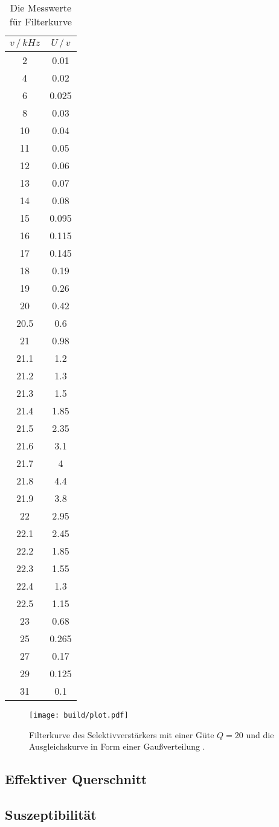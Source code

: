 \begin{table}[H]
    \centering
    \caption{Die Messwerte für Filterkurve}
    \label{tab:filterkurve}
\begin{tabular}{c c}
    \toprule
          $v \, /\,\si{kHz}$ & $U \,/\,\si{v}$ \\
    \midrule
           2 &    0.01 \\
           4 &    0.02 \\
           6 &   0.025 \\
           8 &    0.03 \\
          10 &    0.04 \\
          11 &    0.05 \\
          12 &    0.06 \\
          13 &    0.07 \\
          14 &    0.08 \\
          15 &   0.095 \\
          16 &   0.115 \\
          17 &   0.145 \\
          18 &    0.19 \\
          19 &    0.26 \\
          20 &    0.42 \\
        20.5 &     0.6 \\
          21 &    0.98 \\
        21.1 &     1.2 \\
        21.2 &     1.3 \\
        21.3 &     1.5 \\
        21.4 &    1.85 \\
        21.5 &    2.35 \\
        21.6 &     3.1 \\
        21.7 &       4 \\
        21.8 &     4.4 \\
        21.9 &     3.8 \\
          22 &    2.95 \\
        22.1 &    2.45 \\
        22.2 &    1.85 \\
        22.3 &    1.55 \\
        22.4 &     1.3 \\
        22.5 &    1.15 \\
          23 &    0.68 \\
          25 &   0.265 \\
          27 &    0.17 \\
          29 &   0.125 \\
          31 &    0.1 \\
    \bottomrule
    \end{tabular}
\end{table}


\begin{figure}[H]
\texttt{[image: build/plot.pdf]}
	\caption{Filterkurve des Selektivverstärkers mit einer Güte $Q = 20$ und die Ausgleichskurve in Form einer Gaußverteilung .}
	\label{fig:plot}
\end{figure}

\subsection{Effektiver Querschnitt}

\subsection{Suszeptibilität}
